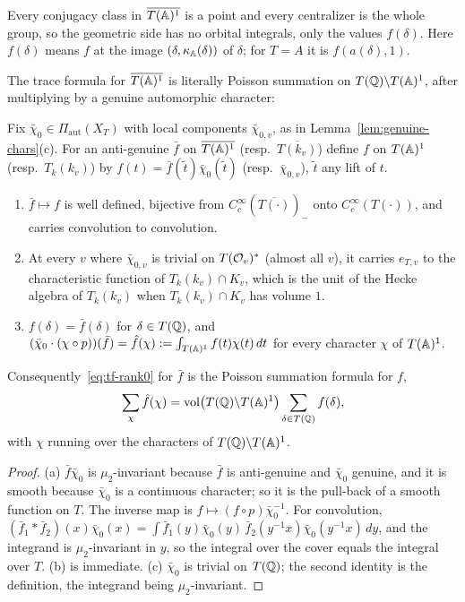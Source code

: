 Every conjugacy class in $\overline{T(\mathbb{A})^1}$ is a point and every
centralizer is the whole group, so the geometric side has no orbital
integrals, only the values $f(\delta)$. Here $f(\delta)$ means $f$ at
the image $(\delta,\kappa_{\mathbb{A}}(\delta))$ of $\delta$; for $T=A$ it is
$f(a(\delta),1)$.

The trace formula for $\overline{T(\mathbb{A})^1}$ is literally Poisson summation
on $T(\mathbb{Q})\backslash T(\mathbb{A})^1$, after multiplying by a genuine automorphic
character:

\begin{lemma}\label{lem:transfer}
Fix $\bar\chi_0\in\Pi_{\mathrm{aut}}(X_T)$ with local components
$\bar\chi_{0,v}$, as in Lemma~\ref{lem:genuine-chars}(c). For an
anti-genuine $\bar f$ on $\overline{T(\mathbb{A})^1}$ (resp.\
$\overline{T(k_v)}$) define $f$ on $T(\mathbb{A})^1$ (resp.\ $T_k(k_v)$) by
$f(t)=\bar f(\tilde t)\bar\chi_0(\tilde t)$ (resp.\ $\bar\chi_{0,v}$),
$\tilde t$ any lift of $t$.
\begin{enumerate}[label=(\alph*)]
\item $\bar f\mapsto f$ is well defined, bijective from
  $C_c^\infty(\overline{T(\cdot)})_-$ onto $C_c^\infty(T(\cdot))$, and
  carries convolution to convolution.
\item At every $v$ where $\bar\chi_{0,v}$ is trivial on $T(\mathcal{O}_v)^*$
  (almost all $v$), it carries $e_{T,v}$ to the characteristic function of
  $T_k(k_v)\cap K_v$, which is the unit of the Hecke algebra of
  $T_k(k_v)$ when $T_k(k_v)\cap K_v$ has volume $1$.
\item $f(\delta)=\bar f(\delta)$ for $\delta\in T(\mathbb{Q})$, and
  $(\bar\chi_0\cdot(\chi\circ p))(\bar f)=\hat f(\chi):=\int_{T(\mathbb{A})^1}
  f(t)\chi(t)\,dt$ for every character $\chi$ of $T(\mathbb{A})^1$.
\end{enumerate}
Consequently~\eqref{eq:tf-rank0} for $\bar f$ is the Poisson summation
formula for $f$,
\[
\sum_\chi\hat f(\chi)=\operatorname{vol}\bigl(T(\mathbb{Q})\backslash T(\mathbb{A})^1\bigr)
\sum_{\delta\in T(\mathbb{Q})}f(\delta),
\]
with $\chi$ running over the characters of $T(\mathbb{Q})\backslash T(\mathbb{A})^1$.
\end{lemma}

\begin{proof}
(a) $\bar f\bar\chi_0$ is $\mu_2$-invariant because $\bar f$ is
anti-genuine and $\bar\chi_0$ genuine, and it is smooth because
$\bar\chi_0$ is a continuous character; so it is the pull-back of a
smooth function on $T$. The inverse map is
$f\mapsto(f\circ p)\bar\chi_0^{-1}$. For convolution,
$(\bar f_1*\bar f_2)(x)\bar\chi_0(x)=\int\bar f_1(y)\bar\chi_0(y)\,
\bar f_2(y^{-1}x)\bar\chi_0(y^{-1}x)\,dy$, and the integrand is
$\mu_2$-invariant in $y$, so the integral over the cover equals the
integral over $T$. (b) is immediate. (c) $\bar\chi_0$ is trivial on
$T(\mathbb{Q})$; the second identity is the definition, the integrand being
$\mu_2$-invariant.
\end{proof}

